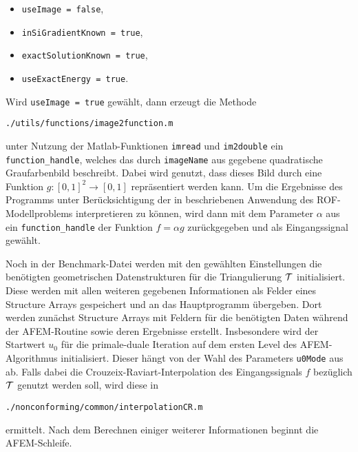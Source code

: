 \begin{itemize}
  \item \texttt{useImage = false},
  \item \texttt{inSiGradientKnown = true},
  \item \texttt{exactSolutionKnown = true},
  \item \texttt{useExactEnergy = true}.
\end{itemize}

\begin{remark}
  Wird \texttt{useImage = true} gewählt, dann erzeugt die Methode 
  \begin{center}
    \texttt{./utils/functions/image2function.m}
  \end{center}
  unter Nutzung der Matlab-Funktionen \texttt{imread} und \texttt{im2double}
  ein \texttt{function\_handle}, welches das durch \texttt{imageName} aus
   gegebene quadratische Graufarbenbild beschreibt.  
  Dabei wird genutzt, dass dieses Bild durch eine Funktion $g:[0,1]^2\to [0,1]$
  repräsentiert werden kann.  
  Um die Ergebnisse des Programms unter Be\-rück\-sich\-ti\-gung der in
   beschriebenen Anwendung des ROF-Modellproblems
  interpretieren zu können, wird dann mit dem Parameter $\alpha$ aus
   ein \texttt{function\_handle} der Funktion
  $f=\alpha g$ zurückgegeben und als Eingangssignal gewählt.
\end{remark}

Noch in der Benchmark-Datei werden mit den gewählten Einstellungen die
benötigten geometrischen Datenstrukturen für die Triangulierung $\mathcal{T}$
initialisiert. 
Diese werden mit allen weiteren gegebenen Informationen als Felder eines
Structure Arrays gespeichert und an das Hauptprogramm übergeben. 
Dort werden zunächst Structure Arrays mit Feldern für die benötigten Daten
während der AFEM-Routine sowie deren Ergebnisse erstellt. 
Insbesondere wird der Startwert $u_0$ für die primale-duale Iteration
auf dem ersten Level des AFEM-Algorithmus initialisiert. 
Dieser hängt von der Wahl des Parameters \texttt{u0Mode} aus
 ab.
Falls dabei die Crouzeix-Raviart-Interpolation des Eingangssignals $f$ 
bezüglich $\mathcal{T}$ genutzt werden soll, wird diese in
\begin{center}
  \texttt{./nonconforming/common/interpolationCR.m}
\end{center}
ermittelt.
Nach dem Berechnen einiger weiterer Informationen beginnt die AFEM-Schleife.

